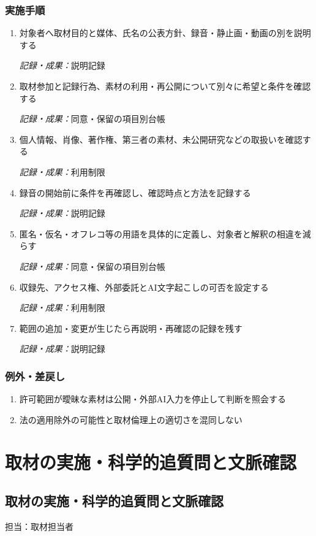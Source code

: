 \documentclass[a4paper,11pt]{article}
\begin{document}
\subsubsection*{実施手順}
\begin{enumerate}[leftmargin=2em,itemsep=0.65em]
\item 対象者へ取材目的と媒体、氏名の公表方針、録音・静止画・動画の別を説明する\par\noindent\textit{記録・成果：}説明記録\nobreak\smallskip
\item 取材参加と記録行為、素材の利用・再公開について別々に希望と条件を確認する\par\noindent\textit{記録・成果：}同意・保留の項目別台帳\nobreak\smallskip
\item 個人情報、肖像、著作権、第三者の素材、未公開研究などの取扱いを確認する\par\noindent\textit{記録・成果：}利用制限\nobreak\smallskip
\item 録音の開始前に条件を再確認し、確認時点と方法を記録する\par\noindent\textit{記録・成果：}説明記録\nobreak\smallskip
\item 匿名・仮名・オフレコ等の用語を具体的に定義し、対象者と解釈の相違を減らす\par\noindent\textit{記録・成果：}同意・保留の項目別台帳\nobreak\smallskip
\item 収録先、アクセス権、外部委託とAI文字起こしの可否を設定する\par\noindent\textit{記録・成果：}利用制限\nobreak\smallskip
\item 範囲の追加・変更が生じたら再説明・再確認の記録を残す\par\noindent\textit{記録・成果：}説明記録\nobreak\smallskip
\end{enumerate}
\subsubsection*{例外・差戻し}
\begin{enumerate}[leftmargin=2em,itemsep=0.35em]
\item 許可範囲が曖昧な素材は公開・外部AI入力を停止して判断を照会する
\item 法の適用除外の可能性と取材倫理上の適切さを混同しない
\end{enumerate}
\section{取材の実施・科学的追質問と文脈確認}
\subsection{取材の実施・科学的追質問と文脈確認}
\par 担当：取材担当者\par\medskip
\end{document}
